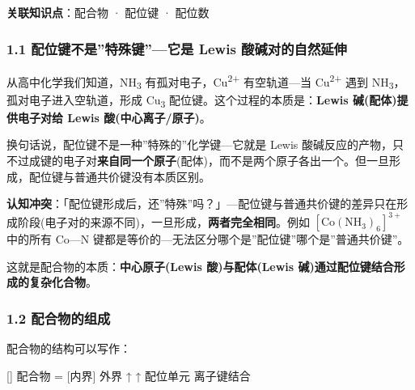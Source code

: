 \documentclass[a4paper,11pt]{ctexart}
\newenvironment{Shaded}{}{}
\newenvironment{Highlighting}{}{}
\newcommand{\NormalTok}[1]{#1}
\newcommand{\箭}{\ensuremath{\rightarrow}}
\newcommand{\左箭}{\ensuremath{\leftarrow}}
\newcommand{\上箭}{\ensuremath{\uparrow}}
\newcommand{\下箭}{\ensuremath{\downarrow}}
\newcommand{\衡}{\ensuremath{\rightleftharpoons}}
\newcommand{\双箭}{\ensuremath{\leftrightarrow}}
\newcommand{\约等于}{\ensuremath{\approx}}
\newcommand{\小于等于}{\ensuremath{\leq}}
\newcommand{\大于等于}{\ensuremath{\geq}}
\newcommand{\不等于}{\ensuremath{\neq}}
\newcommand{\西格马}{\ensuremath{\sigma}}
\newcommand{\派}{\ensuremath{\pi}}
\begin{document}
\textbf{关联知识点}：配合物 · 配位键 · 配位数

\subsubsection{1.1 配位键不是''特殊键''---它是 Lewis 酸碱对的自然延伸}\label{ux914dux4f4dux952eux4e0dux662fux7279ux6b8aux952eux5b83ux662f-lewis-ux9178ux78b1ux5bf9ux7684ux81eaux7136ux5ef6ux4f38}

从高中化学我们知道，NH\textsubscript{3} 有孤对电子，Cu\textsuperscript{2+} 有空轨道---当 Cu\textsuperscript{2+} 遇到 NH\textsubscript{3}，孤对电子进入空轨道，形成 Cu\textsubscript{3} 配位键。这个过程的本质是：\textbf{Lewis 碱(配体)提供电子对给 Lewis 酸(中心离子/原子)}。

换句话说，配位键不是一种''特殊的''化学键---它就是 Lewis 酸碱反应的产物，只不过成键的电子对\textbf{来自同一个原子}(配体)，而不是两个原子各出一个。但一旦形成，配位键与普通共价键没有本质区别。

\textbf{认知冲突}：「配位键形成后，还''特殊''吗？」---配位键与普通共价键的差异只在形成阶段(电子对的来源不同)，一旦形成，\textbf{两者完全相同}。例如 \([\mathrm{Co(NH_3)_6}]^{3+}\) 中的所有 Co---N 键都是等价的---无法区分哪个是''配位键''哪个是''普通共价键''。

这就是配合物的本质：\textbf{中心原子(Lewis 酸)与配体(Lewis 碱)通过配位键结合形成的复杂化合物}。

\subsubsection{1.2 配合物的组成}\label{ux914dux5408ux7269ux7684ux7ec4ux6210}

配合物的结构可以写作：

\begin{Shaded}
\begin{Highlighting}[]
\NormalTok{配合物 = [内界] 外界}
\NormalTok{          ↑       ↑}
\NormalTok{      配位单元   离子键结合}
\end{Highlighting}
\end{Shaded}
\end{document}
